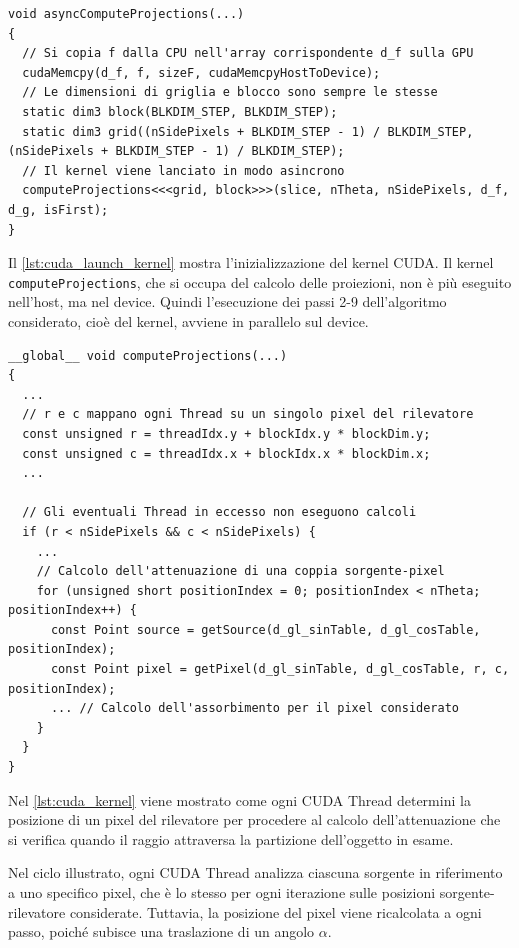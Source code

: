 \documentclass[12pt,a4paper]{report}
\begin{document}
\begin{lstlisting}[language=CStyle, caption={Codice CUDA-C per il lancio del kernel.}, label={lst:cuda_launch_kernel}]
void asyncComputeProjections(...)
{
  // Si copia f dalla CPU nell'array corrispondente d_f sulla GPU
  cudaMemcpy(d_f, f, sizeF, cudaMemcpyHostToDevice);
  // Le dimensioni di griglia e blocco sono sempre le stesse
  static dim3 block(BLKDIM_STEP, BLKDIM_STEP);
  static dim3 grid((nSidePixels + BLKDIM_STEP - 1) / BLKDIM_STEP, (nSidePixels + BLKDIM_STEP - 1) / BLKDIM_STEP);
  // Il kernel viene lanciato in modo asincrono
  computeProjections<<<grid, block>>>(slice, nTheta, nSidePixels, d_f, d_g, isFirst);
}
\end{lstlisting}

Il \autoref{lst:cuda_launch_kernel} mostra l'inizializzazione del kernel CUDA.
Il kernel \mbox{\lstinline{computeProjections},} che si occupa del calcolo delle proiezioni, non è più eseguito nell'host,
ma nel device.
Quindi l'esecuzione dei passi 2-9 dell'algoritmo considerato, cioè del kernel, avviene in parallelo sul device.

\begin{lstlisting}[language=CStyle, caption={Codice CUDA-C del kernel.}, label={lst:cuda_kernel}]
__global__ void computeProjections(...)
{
  ...
  // r e c mappano ogni Thread su un singolo pixel del rilevatore
  const unsigned r = threadIdx.y + blockIdx.y * blockDim.y;
  const unsigned c = threadIdx.x + blockIdx.x * blockDim.x;
  ...

  // Gli eventuali Thread in eccesso non eseguono calcoli
  if (r < nSidePixels && c < nSidePixels) {
    ...
    // Calcolo dell'attenuazione di una coppia sorgente-pixel
    for (unsigned short positionIndex = 0; positionIndex < nTheta; positionIndex++) {
      const Point source = getSource(d_gl_sinTable, d_gl_cosTable, positionIndex);
      const Point pixel = getPixel(d_gl_sinTable, d_gl_cosTable, r, c, positionIndex);
      ... // Calcolo dell'assorbimento per il pixel considerato
    }
  }
}
\end{lstlisting}

Nel \autoref{lst:cuda_kernel} viene mostrato come ogni CUDA Thread determini la posizione di un pixel del rilevatore per procedere
al calcolo dell'attenuazione che si verifica quando il raggio attraversa la partizione dell'oggetto in esame.

Nel ciclo illustrato, ogni CUDA Thread analizza ciascuna sorgente in riferimento a uno specifico pixel, che è lo stesso per ogni
iterazione sulle posizioni sorgente-rilevatore considerate.
Tuttavia, la posizione del pixel viene ricalcolata a ogni passo, poiché subisce una traslazione di un angolo \(\alpha\).
\end{document}
